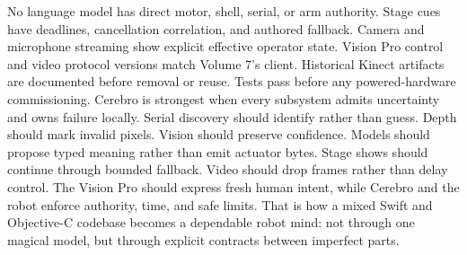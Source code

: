 \markdownRendererUlItem \markdownRendererUntickedBox{} No language model has direct motor, shell, serial, or arm authority.\markdownRendererUlItemEnd 
\markdownRendererUlItem \markdownRendererUntickedBox{} Stage cues have deadlines, cancellation correlation, and authored fallback.\markdownRendererUlItemEnd 
\markdownRendererUlItem \markdownRendererUntickedBox{} Camera and microphone streaming show explicit effective operator state.\markdownRendererUlItemEnd 
\markdownRendererUlItem \markdownRendererUntickedBox{} Vision Pro control and video protocol versions match Volume 7's client.\markdownRendererUlItemEnd 
\markdownRendererUlItem \markdownRendererUntickedBox{} Historical Kinect artifacts are documented before removal or reuse.\markdownRendererUlItemEnd 
\markdownRendererUlItem \markdownRendererUntickedBox{} Tests pass before any powered-hardware commissioning.\markdownRendererUlItemEnd 
\markdownRendererUlEnd \markdownRendererInterblockSeparator
{}
\markdownRendererSectionEnd \markdownRendererSectionBegin
{}\markdownRendererInterblockSeparator
{}Cerebro is strongest when every subsystem admits uncertainty and owns failure locally. Serial discovery should identify rather than guess. Depth should mark invalid pixels. Vision should preserve confidence. Models should propose typed meaning rather than emit actuator bytes. Stage shows should continue through bounded fallback. Video should drop frames rather than delay control. The Vision Pro should express fresh human intent, while Cerebro and the robot enforce authority, time, and safe limits.\markdownRendererParagraphSeparator
{}That is how a mixed Swift and Objective-C codebase becomes a dependable robot mind: not through one magical model, but through explicit contracts between imperfect parts.
\markdownRendererSectionEnd \markdownRendererDocumentEnd